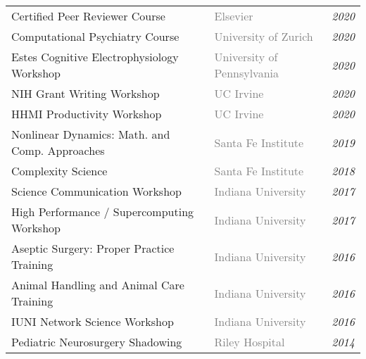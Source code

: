 \documentclass[10pt]{cooperCV2}
\begin{document}
\begin{longtable}{@{} l l @{\extracolsep{\fill}}  l @{}} 
	 
	Certified Peer Reviewer Course & \textcolor{gray}{Elsevier}  & \textit{2020} \\
	 
	Computational Psychiatry Course & \textcolor{gray}{University of Zurich}  & \textit{2020} \\
	 
	Estes Cognitive Electrophysiology Workshop & \textcolor{gray}{University of Pennsylvania}  & \textit{2020} \\
	 
	NIH Grant Writing Workshop & \textcolor{gray}{UC Irvine}  & \textit{2020} \\
	 
	HHMI Productivity Workshop & \textcolor{gray}{UC Irvine}  & \textit{2020} \\
	 
	Nonlinear Dynamics: Math. and Comp. Approaches & \textcolor{gray}{Santa Fe Institute}  & \textit{2019} \\
	 
	Complexity Science & \textcolor{gray}{Santa Fe Institute}  & \textit{2018} \\
	 
	Science Communication Workshop & \textcolor{gray}{Indiana University}  & \textit{2017} \\
	 
	High Performance / Supercomputing Workshop & \textcolor{gray}{Indiana University}  & \textit{2017} \\
	 
	Aseptic Surgery: Proper Practice Training & \textcolor{gray}{Indiana University}  & \textit{2016} \\
	 
	Animal Handling and Animal Care Training & \textcolor{gray}{Indiana University}  & \textit{2016} \\
	 
	IUNI Network Science Workshop & \textcolor{gray}{Indiana University}  & \textit{2016} \\
	 
	Pediatric Neurosurgery Shadowing & \textcolor{gray}{Riley Hospital}  & \textit{2014} \\
	
\end{longtable}
\end{document}

